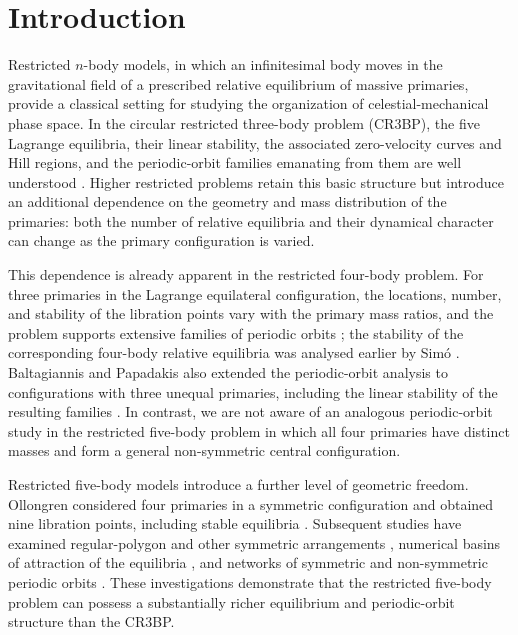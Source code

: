 \section{Introduction}
\label{sec:intro}

Restricted $n$-body models, in which an infinitesimal body moves in the gravitational field of a prescribed relative equilibrium of massive primaries, provide a classical setting for studying the organization of celestial-mechanical phase space. In the circular restricted three-body problem (CR3BP), the five Lagrange equilibria, their linear stability, the associated zero-velocity curves and Hill regions, and the periodic-orbit families emanating from them are well understood \cite{szebehely1967,meyerhalloffin2009}. Higher restricted problems retain this basic structure but introduce an additional dependence on the geometry and mass distribution of the primaries: both the number of relative equilibria and their dynamical character can change as the primary configuration is varied.

This dependence is already apparent in the restricted four-body problem. For three primaries in the Lagrange equilateral configuration, the locations, number, and stability of the libration points vary with the primary mass ratios, and the problem supports extensive families of periodic orbits \cite{baltagiannispapadakis2011a,baltagiannispapadakis2011b}; the stability of the corresponding four-body relative equilibria was analysed earlier by Sim\'o \cite{simo1978}. Baltagiannis and Papadakis also extended the periodic-orbit analysis to configurations with three unequal primaries, including the linear stability of the resulting families \cite{baltagiannispapadakis2011b}. In contrast, we are not aware of an analogous periodic-orbit study in the restricted five-body problem in which all four primaries have distinct masses and form a general non-symmetric central configuration.

Restricted five-body models introduce a further level of geometric freedom. Ollongren considered four primaries in a symmetric configuration and obtained nine libration points, including stable equilibria \cite{ollongren1988}. Subsequent studies have examined regular-polygon and other symmetric arrangements \cite{kalvouridis1999}, numerical basins of attraction of the equilibria \cite{zotossuraj2018}, and networks of symmetric and non-symmetric periodic orbits \cite{zotospapadakis2019}. These investigations demonstrate that the restricted five-body problem can possess a substantially richer equilibrium and periodic-orbit structure than the CR3BP.

